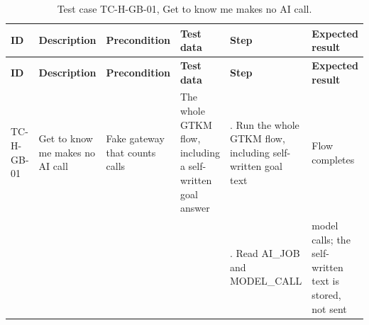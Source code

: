 {\footnotesize{}\renewcommand{\arraystretch}{1.1}
\begin{longtable}{|>{\raggedright\arraybackslash}p{}|>{\raggedright\arraybackslash}p{}|>{\raggedright\arraybackslash}p{}|>{\raggedright\arraybackslash}p{}|>{\raggedright\arraybackslash}p{}|>{\raggedright\arraybackslash}p{}|}
\caption{Test case TC-H-GB-01, Get to know me makes no AI call.} \\
\hline
\textbf{ID} & \textbf{Description} & \textbf{Precondition} & \textbf{Test data} & \textbf{Step} & \textbf{Expected result} \\ \hline
\endfirsthead
\hline
\textbf{ID} & \textbf{Description} & \textbf{Precondition} & \textbf{Test data} & \textbf{Step} & \textbf{Expected result} \\ \hline
\endhead
TC-H-GB-01 & Get to know me makes no AI call & Fake gateway that counts calls & The whole GTKM flow, including a self-\allowbreak{}written goal answer & 1. Run the whole GTKM flow, including self-\allowbreak{}written goal text & Flow completes \\ \cline{5-6}
 &  &  &  & 2. Read AI\_JOB and MODEL\_CALL & 0 model calls; the self-\allowbreak{}written text is stored, not sent \\ \hline
\end{longtable}
}

